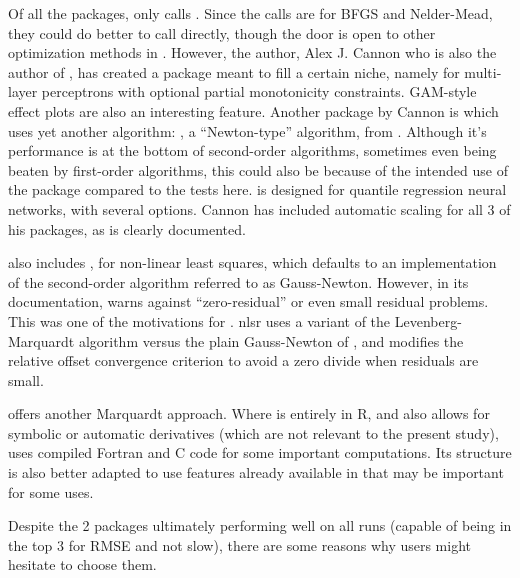 Of all the packages, only  \citep{R-monmlp} calls
. Since the calls are for BFGS and Nelder-Mead, they could
do better to call  directly, though the door is open to
other optimization methods in . However, the author, Alex J.
Cannon who is also the author of , has created a package
meant to fill a certain niche, namely for multi-layer perceptrons with
optional partial monotonicity constraints. GAM-style effect plots are
also an interesting feature. Another package by Cannon is 
\citep{R-qrnn} which uses yet another algorithm: , a
``Newton-type'' algorithm, from . Although it's performance
is at the bottom of second-order algorithms, sometimes even being beaten
by first-order algorithms, this could also be because of the intended
use of the package compared to the tests here.  is designed
for quantile regression neural networks, with several options. Cannon
has included automatic scaling for all 3 of his packages, as is clearly
documented.

 also includes , for non-linear least squares,
which defaults to an implementation of the second-order algorithm
referred to as Gauss-Newton. However, in its documentation, 
warns against ``zero-residual'' or even small residual problems.
\citep[Section 6.4.1]{Nash-nlpor14} This was one of the motivations for
 \citep{R-nlsr}. nlsr uses a variant \citep{jn77ima} of
the Levenberg-Marquardt algorithm versus the plain Gauss-Newton of
, and modifies the relative offset convergence criterion to
avoid a zero divide when residuals are small.

 \citep{minpack.lm} offers another Marquardt approach.
Where  is entirely in R, and also allows for symbolic or
automatic derivatives (which are not relevant to the present study),
 uses compiled Fortran and C code for some important
computations. Its structure is also better adapted to use features
already available in  that may be important for some uses.

Despite the 2 packages ultimately performing well on all runs (capable
of being in the top 3 for RMSE and not slow), there are some reasons why
users might hesitate to choose them.

